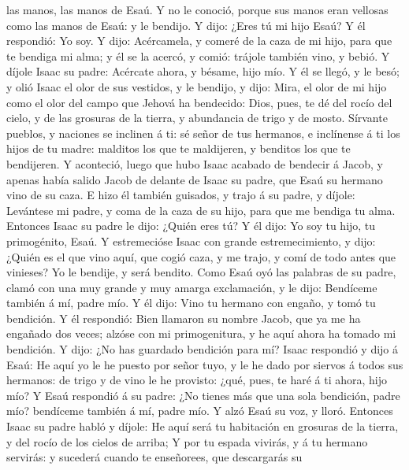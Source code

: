 las manos, las manos de Esaú.  Y no le conoció, porque
sus manos eran vellosas como las manos de Esaú: y le bendijo.
 Y dijo: ¿Eres tú mi hijo Esaú? Y él respondió: Yo soy.
 Y dijo: Acércamela, y comeré de la caza de mi hijo, para
que te bendiga mi alma; y él se la acercó, y comió: trájole también
vino, y bebió.  Y díjole Isaac su padre: Acércate ahora,
y bésame, hijo mío.  Y él se llegó, y le besó; y olió
Isaac el olor de sus vestidos, y le bendijo, y dijo: Mira, el olor de mi
hijo como el olor del campo que Jehová ha bendecido: 
Dios, pues, te dé del rocío del cielo, y de las grosuras de la tierra, y
abundancia de trigo y de mosto.  Sírvante pueblos, y
naciones se inclinen á ti: sé señor de tus hermanos, e inclínense á ti
los hijos de tu madre: malditos los que te maldijeren, y benditos los
que te bendijeren.  Y aconteció, luego que hubo Isaac
acabado de bendecir á Jacob, y apenas había salido Jacob de delante de
Isaac su padre, que Esaú su hermano vino de su caza.  E
hizo él también guisados, y trajo á su padre, y díjole: Levántese mi
padre, y coma de la caza de su hijo, para que me bendiga tu alma.
 Entonces Isaac su padre le dijo: ¿Quién eres tú? Y él
dijo: Yo soy tu hijo, tu primogénito, Esaú.  Y
estremecióse Isaac con grande estremecimiento, y dijo: ¿Quién es el que
vino aquí, que cogió caza, y me trajo, y comí de todo antes que
vinieses? Yo le bendije, y será bendito.  Como Esaú oyó
las palabras de su padre, clamó con una muy grande y muy amarga
exclamación, y le dijo: Bendíceme también á mí, padre mío.
 Y él dijo: Vino tu hermano con engaño, y tomó tu
bendición.  Y él respondió: Bien llamaron su nombre
Jacob, que ya me ha engañado dos veces; alzóse con mi primogenitura, y
he aquí ahora ha tomado mi bendición. Y dijo: ¿No has guardado bendición
para mí?  Isaac respondió y dijo á Esaú: He aquí yo le he
puesto por señor tuyo, y le he dado por siervos á todos sus hermanos: de
trigo y de vino le he provisto: ¿qué, pues, te haré á ti ahora, hijo
mío?  Y Esaú respondió á su padre: ¿No tienes más que una
sola bendición, padre mío? bendíceme también á mí, padre mío. Y alzó
Esaú su voz, y lloró.  Entonces Isaac su padre habló y
díjole: He aquí será tu habitación en grosuras de la tierra, y del rocío
de los cielos de arriba;  Y por tu espada vivirás, y á tu
hermano servirás: y sucederá cuando te enseñorees, que descargarás su
